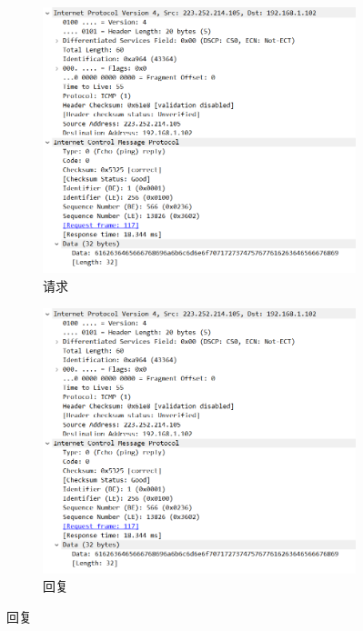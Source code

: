 \documentclass[a4paper,twoside]{article}
\begin{document}
\begin{spacing}{1.2}
\begin{figure}[htb]
	\centering
	\caption{ICMP请求}
	\label{fig:icmp_detail}
	\begin{subfigure}{0.4\textwidth}
		\centering
		\includegraphics[width=\textwidth]{icmp_req.png}
		\caption{请求}
		\label{fig:icmp_req}
	\end{subfigure}
	\begin{subfigure}{0.4\textwidth}
		\centering
		\includegraphics[width=\textwidth]{icmp_req.png}
		\caption{回复}
		\label{fig:icmp_rep}
	\end{subfigure}
\end{figure}


\end{spacing}
\end{document}
